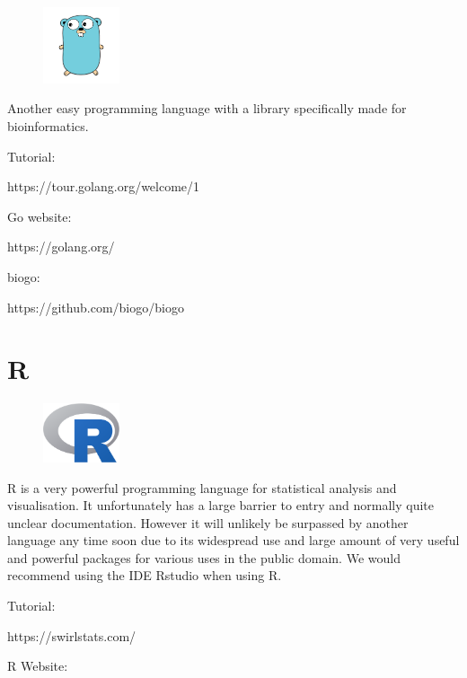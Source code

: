 \documentclass[
  letterpaper,
  DIV=11,
  numbers=noendperiod]{scrreprt}
\begin{document}
\begin{figure}

{\centering \includegraphics[width=0.2\textwidth,height=\textheight]{figures/golang.png}

}

\end{figure}

Another easy programming language with a library specifically made for
bioinformatics.

Tutorial:

https://tour.golang.org/welcome/1

Go website:

https://golang.org/

biogo:

https://github.com/biogo/biogo

\hypertarget{r}{%
\section{R}\label{r}}

\begin{figure}

{\centering \includegraphics[width=0.2\textwidth,height=\textheight]{figures/R.png}

}

\end{figure}

R is a very powerful programming language for statistical analysis and
visualisation. It unfortunately has a large barrier to entry and
normally quite unclear documentation. However it will unlikely be
surpassed by another language any time soon due to its widespread use
and large amount of very useful and powerful packages for various uses
in the public domain. We would recommend using the IDE Rstudio when
using R.

Tutorial:

https://swirlstats.com/

R Website:
\end{document}
